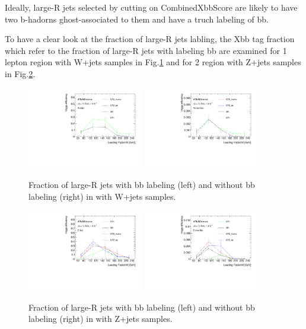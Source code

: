 \par Ideally, large-R jets selected by cutting on CombinedXbbScore are likely to have two b-hadorns ghost-associated to them and have a truch labeling of bb.

\par To have a clear look at the fraction of large-R jets labling, the Xbb tag fraction which refer to the fraction of large-R jets with labeling bb are examined for 1 lepton region with W+jets samples in Fig.\ref{fig:xbbw} and for 2 region with Z+jets samples in Fig.\ref{fig:xbbz}.

\begin{figure}[h]
    \centering
    \includegraphics[width=0.45\textwidth]{appendices/figures/eff_W}
    \includegraphics[width=0.45\textwidth]{appendices/figures/eff_Wnon}
    \caption{Fraction of large-R jets with bb labeling (left) and without bb labeling (right) in with W+jets samples.}
    \label{fig:xbbw}
\end{figure}

\begin{figure}[h]
    \centering
    \includegraphics[width=0.45\textwidth]{appendices/figures/eff_Z}
    \includegraphics[width=0.45\textwidth]{appendices/figures/eff_Znon}
    \caption{Fraction of large-R jets with bb labeling (left) and without bb labeling (right) in with Z+jets samples.}
    \label{fig:xbbz}
\end{figure}

